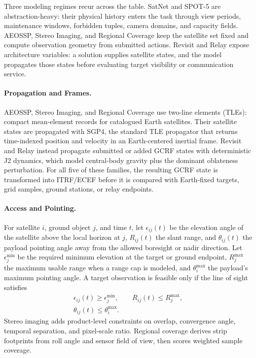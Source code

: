 \documentclass[11pt]{article}
\begin{document}
Three modeling regimes recur across the table. SatNet and SPOT-5 are abstraction-heavy: their physical history enters the task through view periods, maintenance windows, forbidden tuples, camera domains, and capacity fields. AEOSSP, Stereo Imaging, and Regional Coverage keep the satellite set fixed and compute observation geometry from submitted actions. Revisit and Relay expose architecture variables: a solution supplies satellite states, and the model propagates those states before evaluating target visibility or communication service.

\paragraph{Propagation and Frames.} AEOSSP, Stereo Imaging, and Regional Coverage use two-line elements (TLEs): compact mean-element records for catalogued Earth satellites. Their satellite states are propagated with SGP4, the standard TLE propagator that returns time-indexed position and velocity in an Earth-centered inertial frame. Revisit and Relay instead propagate submitted or added GCRF states with deterministic J2 dynamics, which model central-body gravity plus the dominant oblateness perturbation. For all five of these families, the resulting GCRF state is transformed into ITRF/ECEF before it is compared with Earth-fixed targets, grid samples, ground stations, or relay endpoints.

\paragraph{Access and Pointing.} For satellite \(i\), ground object \(j\), and time \(t\), let \(\epsilon_{ij}(t)\) be the elevation angle of the satellite above the local horizon at \(j\), \(R_{ij}(t)\) the slant range, and \(\theta_{ij}(t)\) the payload pointing angle away from the allowed boresight or nadir direction. Let \(\epsilon_j^{\min}\) be the required minimum elevation at the target or ground endpoint, \(R_j^{\max}\) the maximum usable range when a range cap is modeled, and \(\theta_i^{\max}\) the payload's maximum pointing angle. A target observation is feasible only if the line of sight satisfies
\[
  \begin{aligned}
  \epsilon_{ij}(t)\ge \epsilon_j^{\min},\qquad
  R_{ij}(t)\le R_j^{\max},\\
  \theta_{ij}(t)\le \theta_i^{\max}.
  \end{aligned}
\]
Stereo imaging adds product-level constraints on overlap, convergence angle, temporal separation, and pixel-scale ratio. Regional coverage derives strip footprints from roll angle and sensor field of view, then scores weighted sample coverage.
\end{document}
